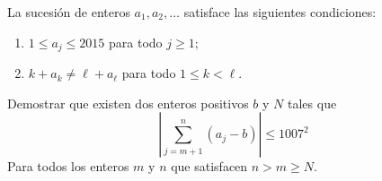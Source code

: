 La sucesión de enteros $a_1,a_2,\dots$ satisface las siguientes condiciones: 
\begin{enumerate}
\item $1\leq a_j \leq 2015$ para todo $j\geq 1$; \newline 
\item $k+a_k\neq\ell+a_{\ell}$ para todo $1\leq k \lt \ell$. 
\end{enumerate}
Demostrar que existen dos enteros positivos $b$ y $N$ tales que 
\[\left\vert\sum_{j=m+1}^n(a_j-b)\right\vert\le1007^2\]
Para todos los enteros $m$ y $n$ que satisfacen $n\gt m\geq N$.